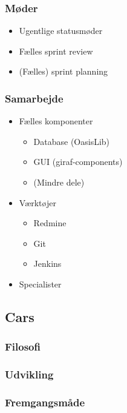 \begin{frame}
\frametitle{Møder}

\begin{itemize}
\item Ugentlige statusmøder
\item Fælles sprint review
\item (Fælles) sprint planning
\end{itemize}

\end{frame}

\begin{frame}
\frametitle{Samarbejde}

\begin{itemize}
\item Fælles komponenter
\begin{itemize}
\item Database (OasisLib)
\item GUI (giraf-components)
\item (Mindre dele)
\end{itemize}
\item Værktøjer
\begin{itemize}
\item Redmine
\item Git
\item Jenkins
\end{itemize}
\item Specialister
\end{itemize}

\end{frame}

\subsection{Cars}

\begin{frame}
\frametitle{Filosofi}

\end{frame}

\begin{frame}
\frametitle{Udvikling}

\end{frame}

\begin{frame}
\frametitle{Fremgangsmåde}

\end{frame}